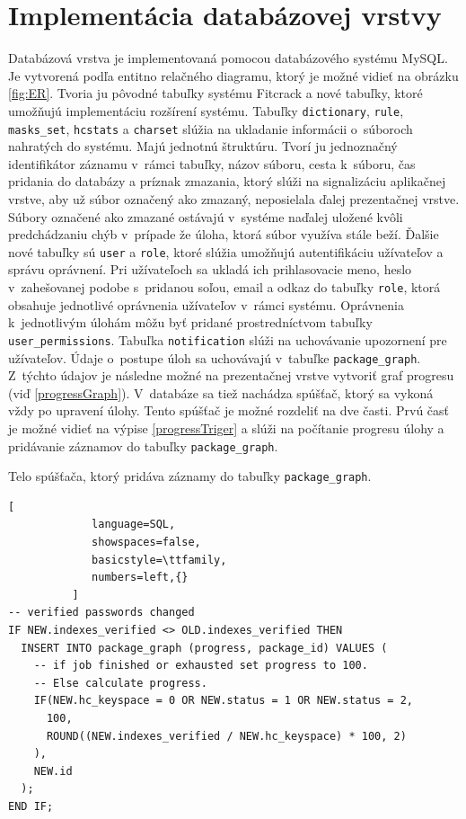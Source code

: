 \documentclass[slovak]{fitthesis}
\begin{document}
\section{Implementácia databázovej vrstvy}
Databázová vrstva je implementovaná pomocou databázového systému MySQL. Je vytvorená podľa entitno relačného diagramu, ktorý je možné vidieť na obrázku \ref{fig:ER}. Tvoria ju pôvodné tabuľky systému Fitcrack a nové tabuľky, ktoré umožňujú implementáciu rozšírení systému. Tabuľky \texttt{dictionary}, \texttt{rule}, \texttt{masks\_set}, \texttt{hcstats} a \texttt{charset} slúžia na ukladanie informácii o~súboroch nahratých do systému. Majú jednotnú štruktúru. Tvorí ju jednoznačný identifikátor záznamu v~rámci tabuľky, názov súboru, cesta k~súboru, čas pridania do databázy a príznak zmazania, ktorý slúži na signalizáciu aplikačnej vrstve, aby už súbor označený ako zmazaný, neposielala ďalej prezentačnej vrstve. Súbory označené ako zmazané ostávajú v~systéme naďalej uložené kvôli predchádzaniu chýb v~prípade že úloha, ktorá súbor využíva stále beží. Ďalšie nové tabuľky sú \texttt{user} a \texttt{role}, ktoré slúžia umožňujú autentifikáciu užívateľov a správu oprávnení. Pri užívateľoch sa ukladá ich prihlasovacie meno, heslo v~zahešovanej podobe s~pridanou soľou, email a odkaz do tabuľky \texttt{role}, ktorá obsahuje jednotlivé oprávnenia užívateľov v~rámci systému. Oprávnenia k~jednotlivým úlohám môžu byť pridané prostredníctvom tabuľky \texttt{user\_permissions}. Tabuľka \texttt{notification} slúži na uchovávanie upozornení pre užívateľov. Údaje o~postupe úloh sa uchovávajú v~tabuľke \texttt{package\_graph}. Z~týchto údajov je následne možné na prezentačnej vrstve vytvoriť graf progresu (viď \ref{progressGraph}). V~databáze sa tiež nachádza spúšťač, ktorý sa vykoná vždy po upravení úlohy. Tento spúšťač je možné rozdeliť na dve časti. Prvú časť je možné vidieť na výpise \ref{progressTriger} a slúži na počítanie progresu úlohy a pridávanie záznamov do tabuľky \texttt{package\_graph}.
\begin{algorithm}
  \caption{Telo spúšťača, ktorý pridáva záznamy do tabuľky \texttt{package\_graph}.}
  \label{progressTriger}
  \begin{lstlisting}[
             language=SQL,
             showspaces=false,
             basicstyle=\ttfamily,
             numbers=left,{}
          ]
-- verified passwords changed
IF NEW.indexes_verified <> OLD.indexes_verified THEN
  INSERT INTO package_graph (progress, package_id) VALUES (
    -- if job finished or exhausted set progress to 100. 
    -- Else calculate progress.
    IF(NEW.hc_keyspace = 0 OR NEW.status = 1 OR NEW.status = 2,
      100,
      ROUND((NEW.indexes_verified / NEW.hc_keyspace) * 100, 2)
    ),
    NEW.id  
  );
END IF;
  \end{lstlisting}
\end{algorithm}
\end{document}
